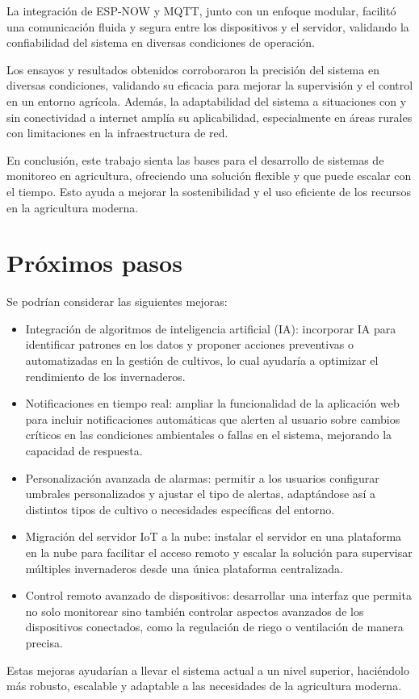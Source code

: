 La integración de ESP-NOW y MQTT, junto con un enfoque modular, facilitó una comunicación fluida y segura entre los dispositivos y el servidor, validando la confiabilidad del sistema en diversas condiciones de operación.

Los ensayos y resultados obtenidos corroboraron la precisión del sistema en diversas condiciones, validando su eficacia para mejorar la supervisión y el control en un entorno agrícola. Además, la adaptabilidad del sistema a situaciones con y sin conectividad a internet amplía su aplicabilidad, especialmente en áreas rurales con limitaciones en la infraestructura de red. 

En conclusión, este trabajo sienta las bases para el desarrollo de sistemas de monitoreo en agricultura, ofreciendo una solución flexible y que puede escalar con el tiempo. Esto ayuda a mejorar la sostenibilidad y el uso eficiente de los recursos en la agricultura moderna.


\section{Próximos pasos}

Se podrían considerar las siguientes mejoras:

\begin{itemize}
    \item Integración de algoritmos de inteligencia artificial (IA): incorporar IA para identificar patrones en los datos y proponer acciones preventivas o automatizadas en la gestión de cultivos, lo cual ayudaría a optimizar el rendimiento de los invernaderos.
    
    \item Notificaciones en tiempo real: ampliar la funcionalidad de la aplicación web para incluir notificaciones automáticas que alerten al usuario sobre cambios críticos en las condiciones ambientales o fallas en el sistema, mejorando la capacidad de respuesta.
    
    \item Personalización avanzada de alarmas: permitir a los usuarios configurar umbrales personalizados y ajustar el tipo de alertas, adaptándose así a distintos tipos de cultivo o necesidades específicas del entorno.
    
    \item Migración del servidor IoT a la nube: instalar el servidor en una plataforma en la nube para facilitar el acceso remoto y escalar la solución para supervisar múltiples invernaderos desde una única plataforma centralizada.   
    
    \item Control remoto avanzado de dispositivos: desarrollar una interfaz que permita no solo monitorear sino también controlar aspectos avanzados de los dispositivos conectados, como la regulación de riego o ventilación de manera precisa.
\end{itemize}

Estas mejoras ayudarían a llevar el sistema actual a un nivel superior, haciéndolo más robusto, escalable y adaptable a las necesidades de la agricultura moderna.

